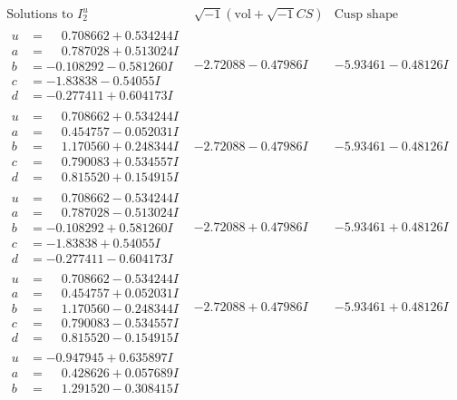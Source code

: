 \documentclass[1p]{elsarticle_modified}
\theoremstyle{definition}
\newcommand{\I}{\sqrt{-1}}
\begin{document}
$$\begin{array}{c|c|c}
\text{Solutions to }I^u_{2}& \I (\text{vol} + \sqrt{-1}CS) & \text{Cusp shape}\\
 \hline 
\begin{aligned}
u &= \phantom{-}0.708662 + 0.534244 I \\
a &= \phantom{-}0.787028 + 0.513024 I \\
b &= -0.108292 - 0.581260 I \\
c &= -1.83838 - 0.54055 I \\
d &= -0.277411 + 0.604173 I\end{aligned}
 & -2.72088 - 0.47986 I & -5.93461 - 0.48126 I \\ \hline\begin{aligned}
u &= \phantom{-}0.708662 + 0.534244 I \\
a &= \phantom{-}0.454757 - 0.052031 I \\
b &= \phantom{-}1.170560 + 0.248344 I \\
c &= \phantom{-}0.790083 + 0.534557 I \\
d &= \phantom{-}0.815520 + 0.154915 I\end{aligned}
 & -2.72088 - 0.47986 I & -5.93461 - 0.48126 I \\ \hline\begin{aligned}
u &= \phantom{-}0.708662 - 0.534244 I \\
a &= \phantom{-}0.787028 - 0.513024 I \\
b &= -0.108292 + 0.581260 I \\
c &= -1.83838 + 0.54055 I \\
d &= -0.277411 - 0.604173 I\end{aligned}
 & -2.72088 + 0.47986 I & -5.93461 + 0.48126 I \\ \hline\begin{aligned}
u &= \phantom{-}0.708662 - 0.534244 I \\
a &= \phantom{-}0.454757 + 0.052031 I \\
b &= \phantom{-}1.170560 - 0.248344 I \\
c &= \phantom{-}0.790083 - 0.534557 I \\
d &= \phantom{-}0.815520 - 0.154915 I\end{aligned}
 & -2.72088 + 0.47986 I & -5.93461 + 0.48126 I \\ \hline\begin{aligned}
u &= -0.947945 + 0.635897 I \\
a &= \phantom{-}0.428626 + 0.057689 I \\
b &= \phantom{-}1.291520 - 0.308415 I \\

\end{aligned}
\end{array}$$
\end{document}
